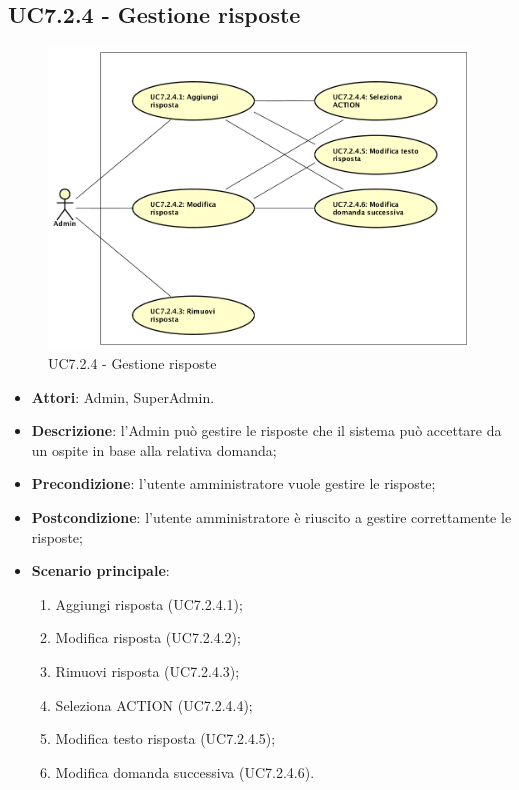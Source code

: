 \documentclass[../AnalisiDeiRequisiti.tex]{subfiles}
\begin{document}
\subsection{UC7.2.4 - Gestione risposte} 
\label{sssec:UC7.2.4} 
\begin{figure}[!h]
	\centering
	\includegraphics[width=\textwidth]{UseCases/UC7_GestionePannelloAdmin/UC7_2_GestioneDomande/UC7_2_4_GestioneRisposte/UC7_2_4_GestioneRisposte.png}
	\caption{UC7.2.4 - Gestione risposte}
\end{figure}
\begin{itemize} 
\item \textbf{Attori}: Admin, SuperAdmin.
\item \textbf{Descrizione}: l'Admin può gestire le risposte che il sistema può accettare da un ospite in base alla relativa domanda;
\item \textbf{Precondizione}: l'utente amministratore vuole gestire le risposte;
\item \textbf{Postcondizione}: l'utente amministratore è riuscito a gestire correttamente le risposte;
\item \textbf{Scenario principale}: \begin{enumerate}\item Aggiungi risposta (UC7.2.4.1);\item Modifica risposta (UC7.2.4.2);\item Rimuovi risposta (UC7.2.4.3);\item Seleziona ACTION (UC7.2.4.4);\item Modifica testo risposta (UC7.2.4.5);\item Modifica domanda successiva (UC7.2.4.6). 
 \end{enumerate}
\end{itemize} 
\end{document}
